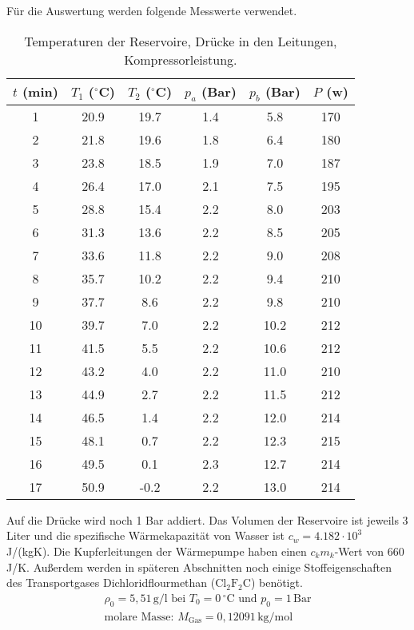 Für die Auswertung werden folgende Messwerte verwendet.
\begin{table}
  \centering
  \caption{Temperaturen der Reservoire, Drücke in den Leitungen, Kompressorleistung.}
  \label{tab:Messdaten}
  \begin{tabular}{c c c c c c}
    \toprule
    $t$ (min) & $T_1$ ($^\circ$C) & $T_2$ ($^\circ$C) & $p_a$ (Bar) & $p_b$ (Bar) & $P$ (w) \\
    \midrule
     1 & 20.9 & 19.7 & 1.4 &  5.8 & 170 \\
     2 & 21.8 & 19.6 & 1.8 &  6.4 & 180 \\
     3 & 23.8 & 18.5 & 1.9 &  7.0 & 187 \\
     4 & 26.4 & 17.0 & 2.1 &  7.5 & 195 \\
     5 & 28.8 & 15.4 & 2.2 &  8.0 & 203 \\
     6 & 31.3 & 13.6 & 2.2 &  8.5 & 205 \\
     7 & 33.6 & 11.8 & 2.2 &  9.0 & 208 \\
     8 & 35.7 & 10.2 & 2.2 &  9.4 & 210 \\
     9 & 37.7 &  8.6 & 2.2 &  9.8 & 210 \\
    10 & 39.7 &  7.0 & 2.2 & 10.2 & 212 \\
    11 & 41.5 &  5.5 & 2.2 & 10.6 & 212 \\
    12 & 43.2 &  4.0 & 2.2 & 11.0 & 210 \\
    13 & 44.9 &  2.7 & 2.2 & 11.5 & 212 \\
    14 & 46.5 &  1.4 & 2.2 & 12.0 & 214 \\
    15 & 48.1 &  0.7 & 2.2 & 12.3 & 215 \\
    16 & 49.5 &  0.1 & 2.3 & 12.7 & 214 \\
    17 & 50.9 & -0.2 & 2.2 & 13.0 & 214 \\
    \bottomrule
  \end{tabular}
\end{table}
Auf die Drücke wird noch 1 Bar addiert.
Das Volumen der Reservoire ist jeweils 3 Liter und die spezifische Wärmekapazität von Wasser ist $ c_w =4.182 \cdot 10^3$ J/(kgK).
Die Kupferleitungen der Wärmepumpe haben einen $c_k m_k$-Wert von 660 J/K.
Außerdem werden in späteren Abschnitten noch einige Stoffeigenschaften des Transportgases Dichloridflourmethan ($\text{Cl}_2\text{F}_2\text{C}$) benötigt.
\begin{align*}
  \rho_0 = 5,51 \, \text{g/l bei } T_0 = 0 \, ^\circ\text{C und } p_0 = 1 \, \text{Bar} \\
  \text{molare Masse: } M_{\text{Gas}} = 0,12091 \, \text{kg/mol}
\end{align*}
\FloatBarrier

